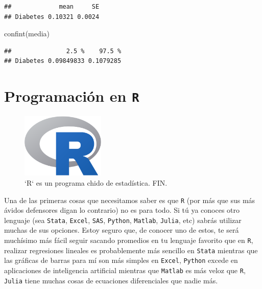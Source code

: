 \documentclass[
]{book}
\newenvironment{Shaded}{\begin{snugshade}}{\end{snugshade}}
\newcommand{\FunctionTok}[1]{\textcolor[rgb]{0.00,0.00,0.00}{#1}}
\newcommand{\NormalTok}[1]{#1}
\begin{document}
\begin{verbatim}
##             mean     SE
## Diabetes 0.10321 0.0024
\end{verbatim}

\begin{Shaded}
\begin{Highlighting}[]
\FunctionTok{confint}\NormalTok{(media)}
\end{Highlighting}
\end{Shaded}

\begin{verbatim}
##               2.5 %    97.5 %
## Diabetes 0.09849833 0.1079285
\end{verbatim}

\hypertarget{appendix-apuxe9ndice}{%
\appendix}


\hypertarget{programaciuxf3n-en-r}{%
\chapter{\texorpdfstring{Programación en \texttt{R}}{Programación en R}}\label{programaciuxf3n-en-r}}

\begin{figure}

{\centering \includegraphics[width=150px]{images/rlogo} 

}

\caption{`R` es un programa chido de estadística. FIN.}\label{fig:unnamed-chunk-211}
\end{figure}

Una de las primeras cosas que necesitamos saber es que \texttt{R} (por más que sus más ávidos defensores digan lo contrario) no es para todo. Si tú ya conoces otro lenguaje (sea \texttt{Stata}, \texttt{Excel}, \texttt{SAS}, \texttt{Python}, \texttt{Matlab}, \texttt{Julia}, etc) sabrás utilizar muchas de sus opciones. Estoy seguro que, de conocer uno de estos, te será muchísimo más fácil seguir sacando promedios en tu lenguaje favorito que en \texttt{R}, realizar regresiones lineales es probablemente más sencillo en \texttt{Stata} mientras que las gráficas de barras para mí son más simples en \texttt{Excel}, \texttt{Python} excede en aplicaciones de inteligencia artificial mientras que \texttt{Matlab} es más veloz que \texttt{R}, \texttt{Julia} tiene muchas cosas de ecuaciones diferenciales que nadie más.
\end{document}
